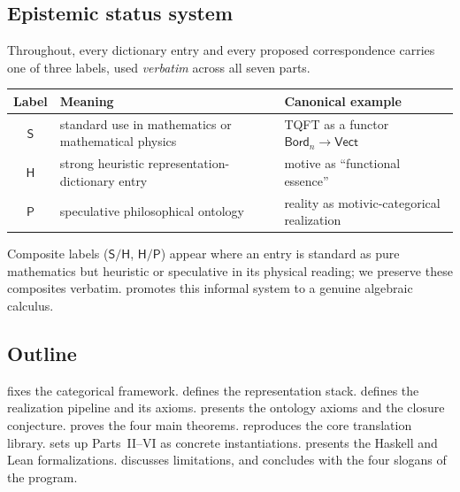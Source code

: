 \documentclass[12pt]{article}
\theoremstyle{definition}
\theoremstyle{remark}
\newcommand{\Vect}{\mathsf{Vect}}
\newcommand{\Bord}{\mathsf{Bord}}
\newcommand{\Sstat}{\mathsf{S}}
\newcommand{\Hstat}{\mathsf{H}}
\newcommand{\Pstat}{\mathsf{P}}
\begin{document}
\subsection{Epistemic status system}
\label{sec:status-intro}

Throughout, every dictionary entry and every proposed correspondence carries
one of three labels, used \emph{verbatim} across all seven parts.

\begin{center}
\begin{tabular}{@{}c>{\raggedright\arraybackslash}p{6.0cm}>{\raggedright\arraybackslash}p{5.6cm}@{}}
\toprule
\textbf{Label} & \textbf{Meaning} & \textbf{Canonical example} \\
\midrule
$\Sstat$ & standard use in mathematics or mathematical physics & TQFT as a functor $\Bord_n \to \Vect$ \\
$\Hstat$ & strong heuristic representation-dictionary entry & motive as ``functional essence'' \\
$\Pstat$ & speculative philosophical ontology & reality as motivic-categorical realization \\
\bottomrule
\end{tabular}
\end{center}

Composite labels ($\Sstat/\Hstat$, $\Hstat/\Pstat$) appear where an entry is
standard as pure mathematics but heuristic or speculative in its physical
reading; we preserve these composites verbatim.  promotes this
informal system to a genuine algebraic calculus.

\subsection{Outline}

 fixes the categorical framework.
 defines the representation stack.
 defines the realization pipeline and its axioms.
 presents the ontology axioms and the closure conjecture.
 proves the four main theorems.
 reproduces the core translation library.
 sets up Parts~II--VI as concrete instantiations.
 presents the Haskell and Lean formalizations.
 discusses limitations, and 
concludes with the four slogans of the program.

\end{document}
